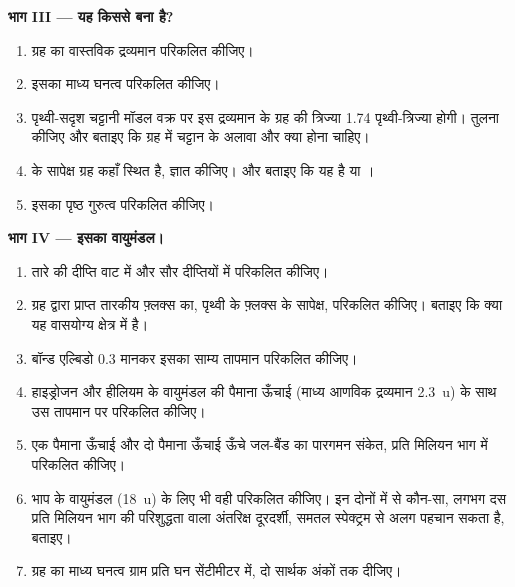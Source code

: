 \begin{problem}
\medskip\noindent\textbf{भाग III --- यह किससे बना है?}
\begin{enumerate}[resume]
\item ग्रह का वास्तविक द्रव्यमान परिकलित कीजिए।
\item इसका माध्य घनत्व परिकलित कीजिए।
\item पृथ्वी-सदृश चट्टानी मॉडल वक्र पर इस द्रव्यमान के ग्रह की
  त्रिज्या 1.74 पृथ्वी-त्रिज्या होगी। तुलना कीजिए और बताइए कि ग्रह में
  चट्टान के अलावा और क्या होना चाहिए।
\item {} के सापेक्ष ग्रह कहाँ स्थित है, ज्ञात कीजिए।
  और बताइए कि यह  है या ।
\item इसका पृष्ठ गुरुत्व परिकलित कीजिए।
\end{enumerate}

\medskip\noindent\textbf{भाग IV --- इसका वायुमंडल।}
\begin{enumerate}[resume]
\item तारे की दीप्ति वाट में और सौर दीप्तियों में
  परिकलित कीजिए।
\item ग्रह द्वारा प्राप्त तारकीय फ़्लक्स का, पृथ्वी के फ़्लक्स के सापेक्ष,
  परिकलित कीजिए। बताइए कि क्या यह वासयोग्य क्षेत्र में है।
\item बॉन्ड एल्बिडो 0.3 मानकर इसका साम्य तापमान परिकलित कीजिए।
\item हाइड्रोजन और हीलियम के वायुमंडल की पैमाना ऊँचाई
  (माध्य आणविक द्रव्यमान \qty{2.3}{u}) के साथ उस तापमान पर परिकलित कीजिए।
\item एक पैमाना ऊँचाई और दो पैमाना ऊँचाई ऊँचे जल-बैंड का पारगमन संकेत,
  प्रति मिलियन भाग में परिकलित कीजिए।
\item भाप के वायुमंडल (\qty{18}{u}) के लिए भी वही परिकलित कीजिए। इन दोनों में से
  कौन-सा, लगभग दस प्रति मिलियन भाग की परिशुद्धता वाला अंतरिक्ष दूरदर्शी,
  समतल स्पेक्ट्रम से अलग पहचान सकता है, बताइए।
\item ग्रह का माध्य घनत्व ग्राम प्रति घन सेंटीमीटर में,
  दो सार्थक अंकों तक दीजिए।
\end{enumerate}
\end{problem}
